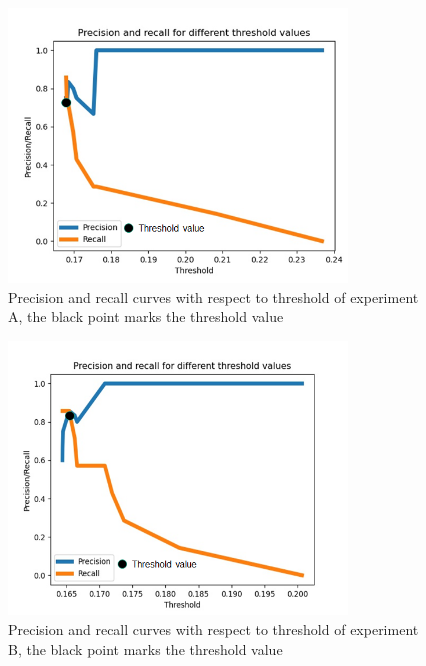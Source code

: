 \documentclass[a4paper, 10pt, twocolumn]{article}
\begin{document}
\begin{figure}[t]
    \begin{center}
        \includegraphics[width=9cm]{stft_threshold_new.png}
    \end{center}
    \caption{Precision and recall curves with respect to threshold of experiment A, the black point marks the threshold value}
    \label{fig:threshold_expa}
\end{figure}



\begin{figure}[t]
\begin{center}
\includegraphics[width=9cm]{order_threshold_new.png}
\end{center}
\caption{Precision and recall curves with respect to threshold of experiment B, the black point marks the threshold value}
\label{fig:threshold_expb}
\end{figure}
 
\end{document}
